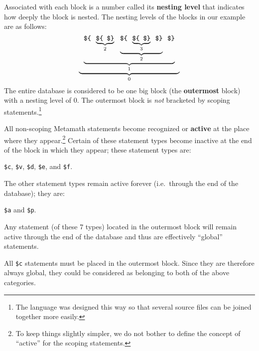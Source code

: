 Associated with each block is a number called its {\bf nesting
level} that indicates how deeply the block is nested.
The nesting levels of the blocks in our example are as follows:
\[
  \underbrace{
    \mbox{\tt \ }
    \underbrace{
     \mbox{\tt \$\char`\{\ }
     \underbrace{
       \mbox{\tt \$\char`\{\ }
       \mbox{\tt \$\char`\}}
     }_{2}
     \mbox{\tt \ }
     \underbrace{
       \mbox{\tt \$\char`\{\ }
       \underbrace{
         \mbox{\tt \$\char`\{\ }
         \mbox{\tt \$\char`\}}
       }_{3}
       \mbox{\tt \ \$\char`\}}
     }_{2}
     \mbox{\tt \ \$\char`\}}
   }_{1}
   \mbox{\tt \ }
 }_{0}
\]
The entire database is considered to be one big block (the {\bf outermost}
block) with a nesting level of 0.  The outermost block is {\em not} bracketed
by scoping statements.\footnote{The language was designed this way so that
several source files can be joined together more easily.}

All non-scoping Metamath statements become recognized or {\bf
active} at the place where they appear.\footnote{To
keep things slightly simpler, we do not bother to define the concept of
``active'' for the scoping statements.}  Certain of these statement types
become inactive at the end of the block in which they appear; these statement
types are:
\begin{center}
  \texttt{\$c}, \texttt{\$v}, \texttt{\$d}, \texttt{\$e}, and \texttt{\$f}.
\end{center}
The other statement types remain active forever (i.e.\ through the end of the
database); they are:
\begin{center}
  \texttt{\$a} and \texttt{\$p}.
\end{center}
Any statement (of these 7 types) located in the outermost
block will remain active through the end of the
database and thus are effectively ``global'' statements.

All \texttt{\$c} statements must be placed in the outermost block.  Since they are
therefore always global, they could be considered as belonging to both of the
above categories.

